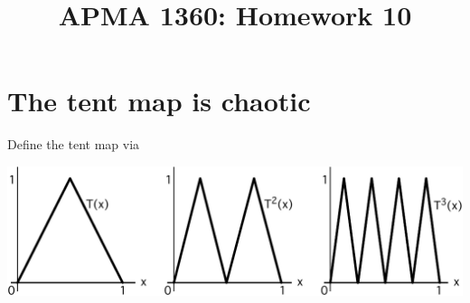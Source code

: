 \documentclass[12pt]{article}
\title{APMA 1360: Homework 10}
\author{}
\date{}
\begin{document}
\maketitle

\vspace{-1in}
\section{The tent map is chaotic}

Define the tent map via

\centerline{%
     \qquad
    \includegraphics[scale=0.6]{Assignment_Figure_8}}
\end{document}
